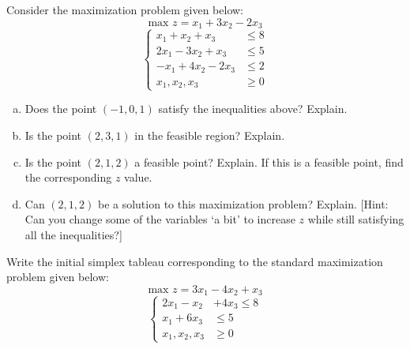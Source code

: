 \documentclass[11pt,letterpaper]{article}
\begin{document}
\newpage



 Consider the maximization problem given below:
	\[
	\text{max } z= x_1 + 3x_2 - 2x_3
	\]
	\[
	\left\{
	\begin{aligned}
	x_1 + x_2 + x_3&\leq 8 \\
	2x_1 - 3x_2 + x_3&\leq 5 \\
	-x_1 + 4x_2 - 2x_3&\leq 2 \\
	x_1, x_2, x_3&\geq 0
	\end{aligned} \right.
	\]
\begin{enumerate}[(a)]
\item Does the point $(-1, 0, 1)$ satisfy the inequalities above? Explain.
\item Is the point $(2, 3, 1)$ in the feasible region? Explain. 
\item Is the point $(2, 1, 2)$ a feasible point? Explain. If this is a feasible point, find the corresponding $z$ value.
\item Can $(2, 1, 2)$ be a solution to this maximization problem? Explain. [Hint: Can you change some of the variables `a bit' to increase $z$ while still satisfying all the inequalities?]
\end{enumerate}



\newpage



 Write the initial simplex tableau corresponding to the standard maximization problem given below: 
	\[
	\text{max } z= 3x_1 - 4x_2 + x_3
	\]
	\[
	\left\{
	\begin{aligned}
	2x_1 - x_2 &+ 4x_3\leq 8 \\
	x_1 + 6x_3&\leq 5 \\
	x_1, x_2, x_3&\geq 0
	\end{aligned} \right.
	\]



\newpage
\end{document}
